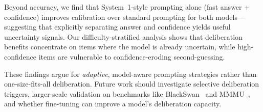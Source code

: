 \documentclass{cvpr}
\begin{document}
Beyond accuracy, we find that System~1-style prompting alone (fast answer + confidence) improves calibration over standard prompting for both models---suggesting that explicitly separating answer and confidence yields useful uncertainty signals. Our difficulty-stratified analysis shows that deliberation benefits concentrate on items where the model is already uncertain, while high-confidence items are vulnerable to confidence-eroding second-guessing.

These findings argue for \emph{adaptive}, model-aware prompting strategies rather than one-size-fits-all deliberation. Future work should investigate selective deliberation triggers, larger-scale validation on benchmarks like BlackSwan~\cite{chinchure2025blackswan} and MMMU~\cite{yue2023mmmu}, and whether fine-tuning can improve a model's deliberation capacity.

{\small


}
\end{document}

